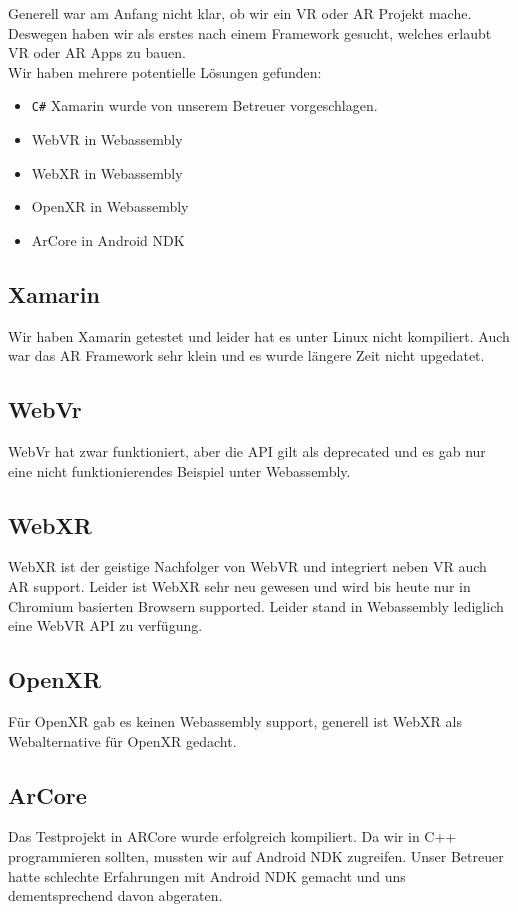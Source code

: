 Generell war am Anfang nicht klar, ob wir ein VR oder AR Projekt mache. Deswegen haben wir als erstes nach einem Framework gesucht, welches erlaubt VR oder AR Apps zu bauen.
\\
Wir haben mehrere potentielle Lösungen gefunden:

\begin{itemize}
  \item \verb|C#| Xamarin wurde von unserem Betreuer vorgeschlagen.
  \item WebVR in Webassembly
  \item WebXR in Webassembly
  \item OpenXR in Webassembly
  \item ArCore in Android NDK
\end{itemize}

\subsection{Xamarin}
Wir haben Xamarin getestet und leider hat es unter Linux nicht kompiliert. Auch war das AR
Framework sehr klein und es wurde längere Zeit nicht upgedatet.

\subsection{WebVr}
WebVr hat zwar funktioniert, aber die API gilt als deprecated und es gab nur eine nicht
funktionierendes Beispiel unter Webassembly.

\subsection{WebXR}
WebXR ist der geistige Nachfolger von WebVR und integriert neben VR auch AR support.
Leider ist WebXR sehr neu gewesen und wird bis heute nur in Chromium basierten Browsern
supported. Leider stand in Webassembly lediglich eine WebVR API zu verfügung.

\subsection{OpenXR}
Für OpenXR gab es keinen Webassembly support, generell ist WebXR als Webalternative für OpenXR gedacht.

\subsection{ArCore}
Das Testprojekt in ARCore wurde erfolgreich kompiliert.
Da wir in C++ programmieren sollten, mussten wir auf Android NDK zugreifen.
Unser Betreuer hatte schlechte Erfahrungen mit Android NDK gemacht und uns
dementsprechend davon abgeraten.

